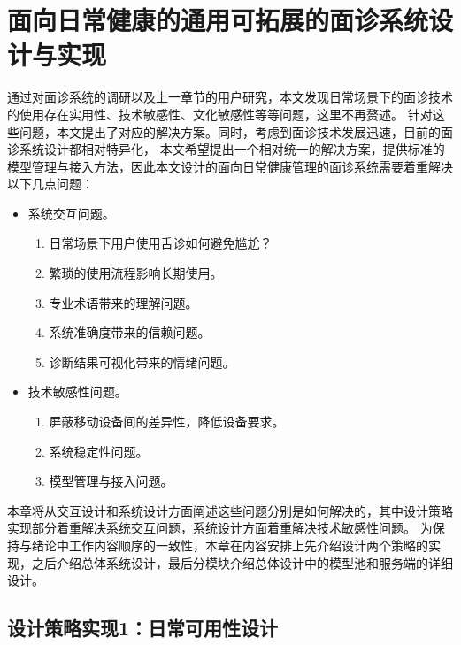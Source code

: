 \chapter{面向日常健康的通用可拓展的面诊系统设计与实现}

通过对面诊系统的调研以及上一章节的用户研究，本文发现日常场景下的面诊技术的使用存在实用性、技术敏感性、文化敏感性等等问题，这里不再赘述。
针对这些问题，本文提出了对应的解决方案。同时，考虑到面诊技术发展迅速，目前的面诊系统设计都相对特异化，
本文希望提出一个相对统一的解决方案，提供标准的模型管理与接入方法，因此本文设计的面向日常健康管理的面诊系统需要着重解决以下几点问题：

\begin{itemize}
    \item 系统交互问题。
        \begin{enumerate}
            \item 日常场景下用户使用舌诊如何避免尴尬？
            \item 繁琐的使用流程影响长期使用。
            \item 专业术语带来的理解问题。
            \item 系统准确度带来的信赖问题。
            \item 诊断结果可视化带来的情绪问题。
        \end{enumerate}
    \item 技术敏感性问题。
        \begin{enumerate}
            \item 屏蔽移动设备间的差异性，降低设备要求。
            \item 系统稳定性问题。
            \item 模型管理与接入问题。
        \end{enumerate}
\end{itemize}

本章将从交互设计和系统设计方面阐述这些问题分别是如何解决的，其中设计策略实现部分着重解决系统交互问题，系统设计方面着重解决技术敏感性问题。
为保持与绪论中工作内容顺序的一致性，本章在内容安排上先介绍设计两个策略的实现，之后介绍总体系统设计，最后分模块介绍总体设计中的模型池和服务端的详细设计。

\section{设计策略实现1：日常可用性设计}

